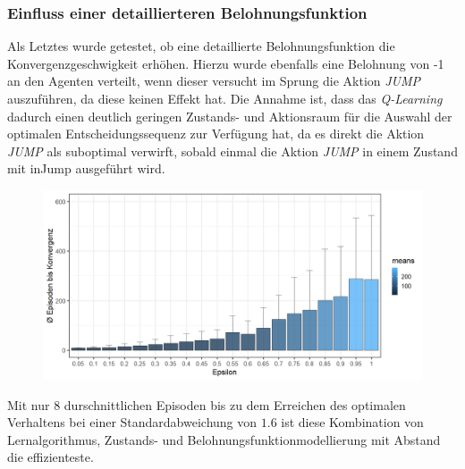 \subsubsection*{Einfluss einer detaillierteren Belohnungsfunktion}
Als Letztes wurde getestet, ob eine detaillierte Belohnungsfunktion die Konvergenzgeschwigkeit erhöhen. Hierzu wurde ebenfalls eine Belohnung von -1 an den Agenten verteilt, wenn dieser versucht im Sprung die Aktion \textit{JUMP} auszuführen, da diese keinen Effekt hat. Die Annahme ist, dass das \textit{Q-Learning} dadurch einen deutlich geringen Zustands- und Aktionsraum für die Auswahl der optimalen Entscheidungssequenz zur Verfügung hat, da es direkt  die Aktion \textit{JUMP} als suboptimal verwirft, sobald einmal die Aktion \textit{JUMP} in einem Zustand mit \glqq inJump\grqq{} ausgeführt wird. 
\begin{figure}[H]
    \centering
    \includegraphics[width=\textwidth]{images/SimpleZ2B4QLearningA}
    \label{fig:test1}
\end{figure}
Mit nur 8 durschnittlichen Episoden bis zu dem Erreichen des optimalen Verhaltens bei einer Standardabweichung von $1.6$ ist diese Kombination von Lernalgorithmus, Zustands- und Belohnungsfunktionmodellierung mit Abstand die effizienteste.


